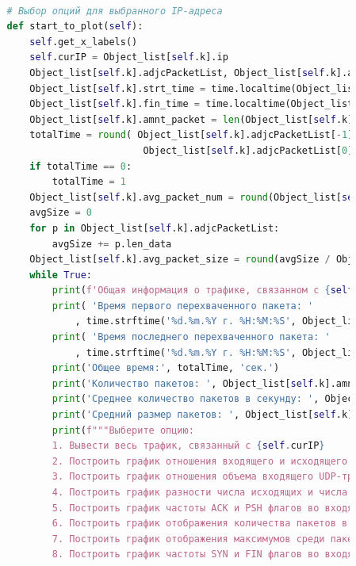 \documentclass[bachelor, och, coursework]{SCWorks}
\begin{document}
\begin{lstlisting}[language=Python]
      
          # Выбор опций для выбранного IP-адреса
          def start_to_plot(self):
              self.get_x_labels()
              self.curIP = Object_list[self.k].ip
              Object_list[self.k].adjcPacketList, Object_list[self.k].adjcIPList = self.get_inf_about_IP()
              Object_list[self.k].strt_time = time.localtime(Object_list[self.k].adjcPacketList[0].timePacket)
              Object_list[self.k].fin_time = time.localtime(Object_list[self.k].adjcPacketList[-1].timePacket)
              Object_list[self.k].amnt_packet = len(Object_list[self.k].adjcPacketList)
              totalTime = round( Object_list[self.k].adjcPacketList[-1].timePacket - \
                                  Object_list[self.k].adjcPacketList[0].timePacket )
              if totalTime == 0:
                  totalTime = 1
              Object_list[self.k].avg_packet_num = round(Object_list[self.k].amnt_packet / totalTime, 3)
              avgSize = 0
              for p in Object_list[self.k].adjcPacketList:
                  avgSize += p.len_data
              Object_list[self.k].avg_packet_size = round(avgSize / Object_list[self.k].amnt_packet, 3)
              while True:
                  print(f'Общая информация о трафике, связанном с {self.curIP}')
                  print( 'Время первого перехваченного пакета: '
                      , time.strftime('%d.%m.%Y г. %H:%M:%S', Object_list[self.k].strt_time) )
                  print( 'Время последнего перехваченного пакета: '
                      , time.strftime('%d.%m.%Y г. %H:%M:%S', Object_list[self.k].fin_time) )
                  print('Общее время:', totalTime, 'сек.')
                  print('Количество пакетов: ', Object_list[self.k].amnt_packet)
                  print('Среднее количество пакетов в секунду: ', Object_list[self.k].avg_packet_num)
                  print('Средний размер пакетов: ', Object_list[self.k].avg_packet_size)  
                  print(f"""Выберите опцию:
                  1. Вывести весь трафик, связанный с {self.curIP}
                  2. Построить график отношения входящего и исходящего трафиков
                  3. Построить график отношения объема входящего UDP-трафика и объёма входящего TCP-трафика
                  4. Построить график разности числа исходящих и числа входящих ACK-флагов в единицу времени
                  5. Построить график частоты ACK и PSH флагов во входящих пакетах
                  6. Построить график отображения количества пакетов в единицу времени
                  7. Построить график отображения максимумов среди пакетов в единицу времени
                  8. Построить график частоты SYN и FIN флагов во входящих пакетах

\end{lstlisting}
\end{document}
